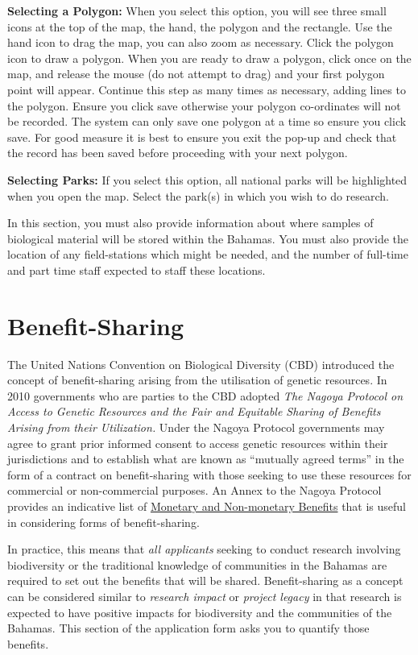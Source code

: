 \documentclass[
]{book}
\begin{document}
\textbf{Selecting a Polygon:} When you select this option, you will see three small icons at the top of the map, the hand, the polygon and the rectangle. Use the hand icon to drag the map, you can also zoom as necessary. Click the polygon icon to draw a polygon. When you are ready to draw a polygon, click once on the map, and release the mouse (do not attempt to drag) and your first polygon point will appear. Continue this step as many times as necessary, adding lines to the polygon. Ensure you click save otherwise your polygon co-ordinates will not be recorded. The system can only save one polygon at a time so ensure you click save. For good measure it is best to ensure you exit the pop-up and check that the record has been saved before proceeding with your next polygon.

\textbf{Selecting Parks:} If you select this option, all national parks will be highlighted when you open the map. Select the park(s) in which you wish to do research.

In this section, you must also provide information about where samples of biological material will be stored within the Bahamas. You must also provide the location of any field-stations which might be needed, and the number of full-time and part time staff expected to staff these locations.

\hypertarget{benefit-sharing}{%
\chapter{Benefit-Sharing}\label{benefit-sharing}}

The United Nations Convention on Biological Diversity (CBD) introduced the concept of benefit-sharing arising from the utilisation of genetic resources. In 2010 governments who are parties to the CBD adopted \emph{The Nagoya Protocol on Access to Genetic Resources and the Fair and Equitable Sharing of Benefits Arising from their Utilization.} Under the Nagoya Protocol governments may agree to grant prior informed consent to access genetic resources within their jurisdictions and to establish what are known as ``mutually agreed terms'' in the form of a contract on benefit-sharing with those seeking to use these resources for commercial or non-commercial purposes. An Annex to the Nagoya Protocol provides an indicative list of \href{https://www.cbd.int/abs/text/articles/?sec=abs-37}{Monetary and Non-monetary Benefits} that is useful in considering forms of benefit-sharing.

In practice, this means that \emph{all applicants} seeking to conduct research involving biodiversity or the traditional knowledge of communities in the Bahamas are required to set out the benefits that will be shared. Benefit-sharing as a concept can be considered similar to \emph{research impact} or \emph{project legacy} in that research is expected to have positive impacts for biodiversity and the communities of the Bahamas. This section of the application form asks you to quantify those benefits.
\end{document}
